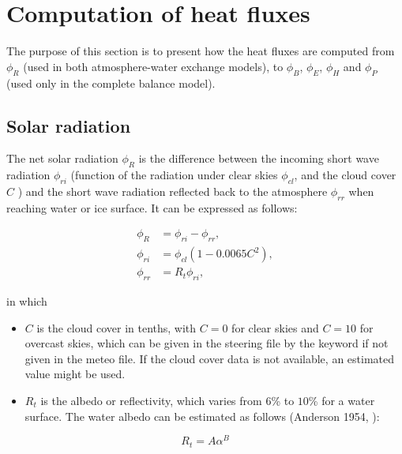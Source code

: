 \section{Computation of heat fluxes}

The purpose of this section is to present how the heat fluxes are computed from $\phi_R$ (used in both atmosphere-water exchange models),
to $\phi_B$, $\phi_E$, $\phi_H$ and $\phi_P$ (used only in the complete balance model).

\subsection{Solar radiation}

The net solar radiation $\phi_R$ is the difference between
the incoming short wave radiation $\phi_{ri}$ (function of the radiation under clear skies $\phi_{cl}$, and the cloud cover $C$ \cite{iqbal2012introduction})
and the short wave radiation reflected back to the atmosphere $\phi_{rr}$ when reaching water or ice surface.
It can be expressed as follows:

\begin{equation} \label{eq:phir}
  \begin{aligned}
   \phi_R &= \phi_{ri} - \phi_{rr}, \\
   \phi_{ri} &= \phi_{cl} ( 1-0.0065C^2 ), \\
   \phi_{rr} &= R_t \phi_{ri},
  \end{aligned}
\end{equation}

in which
\begin{itemize}
    \item $C$ is the cloud cover in tenths, with $C = 0$ for clear skies and $C = 10$ for overcast skies, which can be given in the  steering file by the keyword  if not given in the meteo file. If the cloud cover data is not available, an estimated value might be used.
    \item $R_t$ is the albedo or reflectivity, which varies from $6$\% to $10$\% for a water surface.
    The water albedo can be estimated as follows (Anderson 1954, \cite{anderson1954energy}):
\end{itemize}

\begin{equation} \label{eq:albedo}
   R_t = A\alpha^B
\end{equation}

